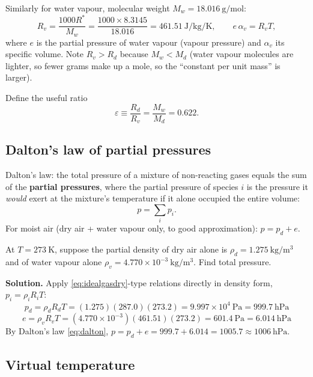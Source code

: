 \documentclass[11pt]{article}
\newcommand{\Rd}{R_d}
\newcommand{\Rv}{R_v}
\begin{document}
Similarly for water vapour, molecular weight $M_w = 18.016\ \si{\g\per\mol}$:
\begin{equation}
\Rv = \frac{1000 R^{*}}{M_w} = \frac{1000\times8.3145}{18.016} = 461.51\ \si{\joule\per\kg\per\kelvin}, \qquad e\,\alpha_v = \Rv T,
\label{eq:Rv}
\end{equation}
where $e$ is the partial pressure of water vapour (vapour pressure) and $\alpha_v$ its specific volume. Note $\Rv > \Rd$ because $M_w < M_d$ (water vapour molecules are lighter, so fewer grams make up a mole, so the ``constant per unit mass'' is larger).

Define the useful ratio
\begin{equation}
\varepsilon \equiv \frac{\Rd}{\Rv} = \frac{M_w}{M_d} = 0.622.
\label{eq:epsilon}
\end{equation}

\subsection{Dalton's law of partial pressures}
Dalton's law: the total pressure of a mixture of non-reacting gases equals the sum of the \textbf{partial pressures}, where the partial pressure of species $i$ is the pressure it \emph{would} exert at the mixture's temperature if it alone occupied the entire volume:
\begin{equation}
p = \sum_i p_i.
\label{eq:dalton}
\end{equation}
For moist air (dry air + water vapour only, to good approximation): $p = p_d + e$.

\begin{worked}
At $T=273\ \text{K}$, suppose the partial density of dry air alone is $\rho_d=1.275\ \si{\kg\per\cubic\m}$ and of water vapour alone $\rho_v = 4.770\times10^{-3}\ \si{\kg\per\cubic\m}$. Find total pressure.

\textbf{Solution.} Apply \eqref{eq:idealgasdry}-type relations directly in density form, $p_i = \rho_i R_i T$:
\[
p_d = \rho_d \Rd T = (1.275)(287.0)(273.2) = 9.997\times10^{4}\ \text{Pa} = 999.7\ \text{hPa}
\]
\[
e = \rho_v \Rv T = (4.770\times10^{-3})(461.51)(273.2) = 601.4\ \text{Pa} = 6.014\ \text{hPa}
\]
By Dalton's law \eqref{eq:dalton}, $p = p_d + e = 999.7+6.014 = 1005.7 \approx 1006\ \text{hPa}$.
\end{worked}

\subsection{Virtual temperature}
\label{sec:virtualT}
\end{document}

